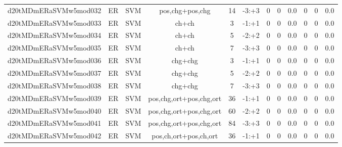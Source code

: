 \documentclass[a4paper]{article}
\begin{document}
\begin{landscape}
\begin{center}
\begin{tabular}{ |c|c|c|c|c|c|c|c|c|c|c|c|}
 
 	
 	\small{ d20tMDmERaSVMw5mod032 } & ER & SVM & pos,chg+pos,chg  &  14 &  -3:+3  &  0 & 0 & 0.0  &  0 & 0 & 0.0 \\
 	

 
 	
 	\small{ d20tMDmERaSVMw5mod033 } & ER & SVM & ch+ch  &  3 &  -1:+1  &  0 & 0 & 0.0  &  0 & 0 & 0.0 \\
 	

 
 	
 	\small{ d20tMDmERaSVMw5mod034 } & ER & SVM & ch+ch  &  5 &  -2:+2  &  0 & 0 & 0.0  &  0 & 0 & 0.0 \\
 	

 
 	
 	\small{ d20tMDmERaSVMw5mod035 } & ER & SVM & ch+ch  &  7 &  -3:+3  &  0 & 0 & 0.0  &  0 & 0 & 0.0 \\
 	

 
 	
 	\small{ d20tMDmERaSVMw5mod036 } & ER & SVM & chg+chg  &  3 &  -1:+1  &  0 & 0 & 0.0  &  0 & 0 & 0.0 \\
 	

 
 	
 	\small{ d20tMDmERaSVMw5mod037 } & ER & SVM & chg+chg  &  5 &  -2:+2  &  0 & 0 & 0.0  &  0 & 0 & 0.0 \\
 	

 
 	
 	\small{ d20tMDmERaSVMw5mod038 } & ER & SVM & chg+chg  &  7 &  -3:+3  &  0 & 0 & 0.0  &  0 & 0 & 0.0 \\
 	

 
 	
 	\small{ d20tMDmERaSVMw5mod039 } & ER & SVM & pos,chg,ort+pos,chg,ort  &  36 &  -1:+1  &  0 & 0 & 0.0  &  0 & 0 & 0.0 \\
 	

 
 	
 	\small{ d20tMDmERaSVMw5mod040 } & ER & SVM & pos,chg,ort+pos,chg,ort  &  60 &  -2:+2  &  0 & 0 & 0.0  &  0 & 0 & 0.0 \\
 	

 
 	
 	\small{ d20tMDmERaSVMw5mod041 } & ER & SVM & pos,chg,ort+pos,chg,ort  &  84 &  -3:+3  &  0 & 0 & 0.0  &  0 & 0 & 0.0 \\
 	

 
 	
 	\small{ d20tMDmERaSVMw5mod042 } & ER & SVM & pos,ch,ort+pos,ch,ort  &  36 &  -1:+1  &  0 & 0 & 0.0  &  0 & 0 & 0.0 \\
 	


\end{tabular}
\end{center}
\end{landscape}
\end{document}
